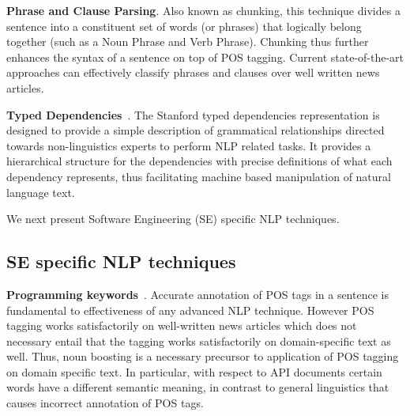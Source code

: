 \textbf{Phrase and Clause Parsing}. Also known as chunking, this technique divides a sentence into a constituent set of words (or phrases) that logically belong together (such as a Noun Phrase and Verb Phrase). Chunking thus further enhances the syntax of a sentence on top of POS tagging. Current state-of-the-art approaches can effectively classify phrases and clauses over well written news articles.

\textbf{Typed Dependencies}~\cite{Marneffe06LREC,Marneffe08COLING}. The Stanford typed dependencies representation  is designed to provide a simple description of grammatical relationships directed towards non-linguistics experts to perform NLP related tasks. It provides a hierarchical structure for the dependencies with precise definitions of what each dependency represents, thus facilitating machine based manipulation of natural language text.



We next present Software Engineering (SE) specific NLP techniques.

\subsection{SE specific NLP techniques}
\label{sub:SENLPback}

\textbf{Programming keywords}~\cite{pandita12:inferring}. Accurate annotation of POS tags in a sentence is fundamental to effectiveness of any advanced NLP technique.
However POS tagging works satisfactorily on well-written news articles which does not necessary entail that the tagging works satisfactorily on domain-specific text as well.
Thus, noun boosting is a necessary precursor to application of POS tagging on domain specific text.
In particular, with respect to API documents certain words have a different semantic meaning, in contrast to general linguistics that causes incorrect annotation of POS tags.

